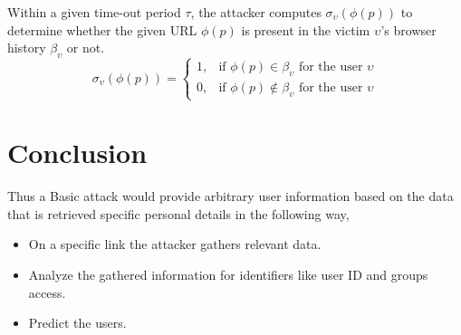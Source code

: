 \documentclass{article}
\begin{document}
\begin{enumerate}
	
	Within a given time-out period $\tau$, the attacker computes $\sigma_\upsilon(\phi(p))$ to determine whether the given URL $\phi(p)$ is present in the victim $\upsilon$'s browser history $\beta_\upsilon$ or not.
	\begin{equation*}
	\sigma_\upsilon(\phi(p))=
\begin{cases}
1, & \text{if } \phi(p) \in \beta_\upsilon \text{ for the user }\upsilon \\
0, & \text{if } \phi(p) \notin \beta_\upsilon \text{ for the user }\upsilon
\end{cases}
	\end{equation*}
\end{enumerate}
\section*{Conclusion}
Thus a Basic attack would provide arbitrary user information based on the data that is retrieved specific personal details in the following way,\\
\begin{itemize}
\item On a specific link the attacker gathers relevant data.\\
\item Analyze the gathered information for identifiers like user ID and groups access.\\
\item Predict the users.\\
\end{itemize}
\end{document}
